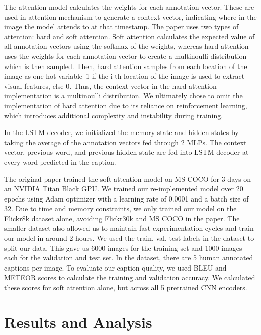 \documentclass{article}
\begin{document}
The attention model calculates the weights for each annotation vector. These are used in attention mechanism to generate a context vector, indicating where in the image the model attends to at that timestamp. The paper uses two types of attention: hard and soft attention. Soft attention calculates the expected value of all annotation vectors using the softmax of the weights, whereas hard attention uses the weights for each annotation vector to create a multinoulli distribution which is then sampled. Then, hard attention samples from each location of the image as one-hot variable--1 if the i-th location of the image is used to extract visual features, else 0. Thus, the context vector in the hard attention implementation is a multinoulli distribution. We ultimately chose to omit the implementation of hard attention due to its reliance on reinforcement learning, which introduces additional complexity and instability during training. 

In the LSTM decoder, we initialized the memory state and hidden states by taking the average of the annotation vectors fed through 2 MLPs. The context vector, previous word, and previous hidden state are fed into LSTM decoder at every word predicted in the caption.

The original paper trained the soft attention model on MS COCO for 3 days on an NVIDIA Titan Black GPU. We trained our re-implemented model over 20 epochs using Adam optimizer with a learning rate of 0.0001 and a batch size of 32. Due to time and memory constraints, we only trained our model on the Flickr8k dataset alone, avoiding Flickr30k and MS COCO in the paper. The smaller dataset also allowed us to maintain fast experimentation cycles and train our model in around 2 hours. We used the train, val, test labels in the dataset to split our data. This gave us 6000 images for the training set and 1000 images each for the validation and test set. In the dataset, there are 5 human annotated captions per image. To evaluate our caption quality, we used BLEU and METEOR scores to calculate the training and validation accuracy. We calculated these scores for soft attention alone, but across all 5 pretrained CNN encoders.


\section{Results and Analysis}
\end{document}
